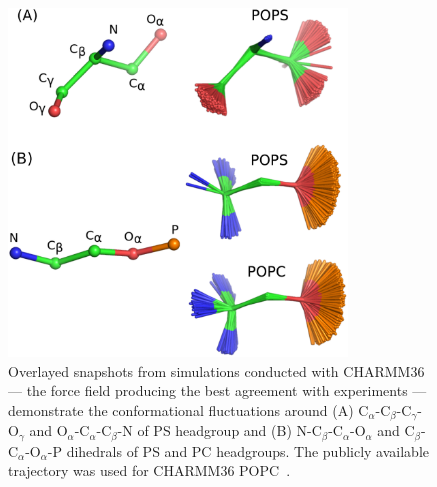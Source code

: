 \documentclass[aps,prl,superscriptaddress,twocolumn]{revtex4}
\begin{document}
\begin{figure}[]
  \centering
  \includegraphics[width=9.0cm]{../Figs/structures.eps}
  \caption{\label{HGstructuresPSandPC}
    Overlayed snapshots from simulations conducted with CHARMM36 --- the force field producing the best agreement with experiments ---
     demonstrate the conformational fluctuations around
    (A) C$_\alpha$-C$_\beta$-C$_\gamma$-O$_\gamma$ and  O$_\alpha$-C$_\alpha$-C$_\beta$-N
    of PS headgroup and (B) N-C$_\beta$-C$_\alpha$-O$_\alpha$ and C$_\beta$-C$_\alpha$-O$_\alpha$-P
    dihedrals of PS and PC headgroups. The publicly available trajectory was used for CHARMM36 POPC~\cite{POPCcharmm36T303K}.
  }
\end{figure}
\end{document}
